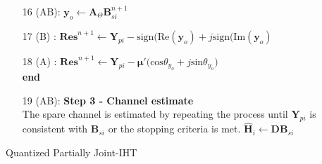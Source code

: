 \begin{center}
{\begin{minipage}{1.2\linewidth}
\begin{algorithm}[H]
\begin{enumerate}
 \hspace*{\algorithmicindent} 
\item [16 (AB):]\hspace*{\algorithmicindent} $ \mathbf{y}_o \leftarrow \mathbf{A}_\Theta \mathrel{\mathbf{B}_{si}^{n+1}}$
     \hspace*{\algorithmicindent}
     \hspace*{\algorithmicindent}
  \item[17 (B) : ] \hspace*{\algorithmicindent} $\mathbf{Res}^{n+1} \leftarrow \mathbf{Y}_{pi}-\text{sign(Re}(\mathbf{y}_o)+j\text{sign(Im}(\mathbf{y}_o) $\\
 \item[18 (A) : ]  \hspace*{\algorithmicindent}  $ \mathbf{Res}^{n+1} \leftarrow \mathbf{Y}_{pi}-\mathbf{\mu'} \Big( \text{cos}\theta_{y_o} + j\text{sin}\theta_{y_o} \Big)$\\
      \textbf{end}\\
      \rule{0pt}{4ex}    
\item [19 (AB):]\textbf{Step 3 - Channel estimate}\\
The spare channel is estimated by repeating the process until $\mathbf{Y}_{pi}$ is consistent with $\mathbf{B}_{si}$ or the stopping criteria is met.
 \hspace*{\algorithmicindent}
$ \mathbf{\hat{H}}_i \leftarrow \mathbf{D} \mathbf{B}_{si}$
\hspace*{\algorithmicindent} 
\end{enumerate}
 \caption{ Quantized Partially Joint-IHT}
 \label{algo3}
\end{algorithm}
\end{minipage}}


\end{center}
